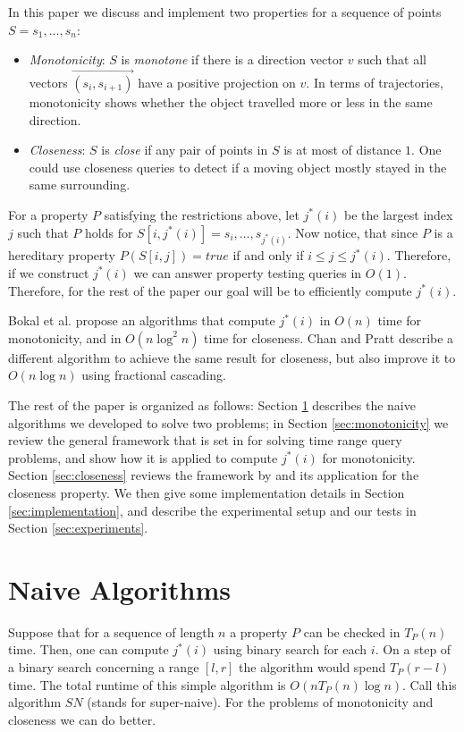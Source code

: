 \documentclass{article}
\begin{document}
In this paper we discuss and implement two properties for a sequence of points $S = s_1, \dots, s_n$:
\begin{itemize}
    \item \textit{Monotonicity}:  $S$ is \textit{monotone} if there
    is a direction vector $v$ such that all vectors $\vec{(s_i,
    s_{i+1})}$ have a positive projection on $v$. In terms of
    trajectories, monotonicity shows whether the object travelled
    more or less in the same direction.
    \item \textit{Closeness}: $S$ is \textit{close} if any pair of
    points in $S$ is at most of distance $1$. One could use closeness
    queries to detect if a moving object mostly stayed in the same
    surrounding.
\end{itemize}

For a property $P$ satisfying the restrictions above, let $j^*(i)$
be the largest index $j$ such that $P$ holds for $S[i, j^*(i)] =
s_i, \dots, s_{j^*(i)}$. Now notice, that since $P$ is a hereditary
property $P(S[i, j]) = true$ if and only if $i \leq j \leq j^*(i)$.
Therefore, if we construct $j^*(i)$ we can answer property testing
queries in $O(1)$. Therefore, for the rest of the paper our goal
will be to efficiently compute $j^*(i)$.

Bokal et al. \cite{bokal2015} propose an algorithms that compute
$j^*(i)$ in $O(n)$ time for monotonicity, and in $O(n\log^2 n)$
time for closeness. Chan and Pratt \cite{chan2016} describe a
different algorithm to achieve the same result for closeness, but
also improve it to $O(n\log n)$ using fractional cascading.

The rest of the paper is organized as follows: Section \ref{sec:naive}
describes the naive algorithms we developed to solve two problems;
in Section \ref{sec:monotonicity} we review the general framework
that is set in \cite{bokal2015} for solving time range query problems,
and show how it is applied to compute $j^*(i)$ for monotonicity.
Section \ref{sec:closeness} reviews the framework by \cite{chan2016}
and its application for the closeness property. We then give some
implementation details in Section \ref{sec:implementation}, and
describe the experimental setup and our tests in Section
\ref{sec:experiments}.

\section{Naive Algorithms}
\label{sec:naive}
Suppose that for a sequence of length $n$ a property $P$ can be
checked in $T_P(n)$ time. Then, one can compute $j^*(i)$ using
binary search for each $i$. On a step of a binary search concerning
a range $[l, r]$ the algorithm would spend $T_P(r - l)$ time. The
total runtime of this simple algorithm is $O(nT_P(n)\log n)$. Call
this algorithm $SN$ (stands for super-naive). For the problems of
monotonicity and closeness we can do better.
\end{document}
